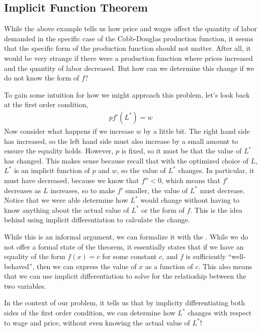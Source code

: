 \subsection*{Implicit Function Theorem}
While the above example tells us how price and wages affect the quantity of labor demanded in the specific case of the Cobb-Douglas production function, it seems that the specific form of the production function should not matter. After all, it would be very strange if there were a production function where prices increased and the quantity of labor decreased. But how can we determine this change if we do not know the form of $f$?

To gain some intuition for how we might approach this problem, let's look back at the first order condition,
\begin{align*}
    p f'(L^*) = w
\end{align*}
Now consider what happens if we increase $w$ by a little bit. The right hand side has increased, so the left hand side must also increase by a small amount to ensure the equality holds. However, $p$ is fixed, so it must be that the value of $L^*$ has changed. This makes sense because recall that with the optimized choice of $L$, $L^*$ is an implicit function of $p$ and $w$, so the value of $L^*$ changes.  In particular, it must have decreased, because we know that $f'' < 0$, which means that $f'$ decreases as $L$ increases, so to make $f'$ smaller, the value of $L^*$ must decrease. Notice that we were able determine how $L^*$ would change without having to know anything about the actual value of $L^*$ or the form of $f$. This is the idea behind using implicit differentiation to calculate the change. 

While this is an informal argument, we can formalize it with the . While we do not offer a formal state of the theorem, it essentially states that if we have an equality of the form $f(x) = c$ for some constant $c$, and $f$ is sufficiently ``well-behaved'', then we can express the value of $x$ as a function of $c$. This also means that we can use implicit differentiation to solve for the relatioship between the two variables.

In the context of our problem, it tells us that by implicity differentiating both sides of the first order condition, we can determine how $L^*$ changes with respect to wage and price, without even knowing the actual value of $L^*$!

